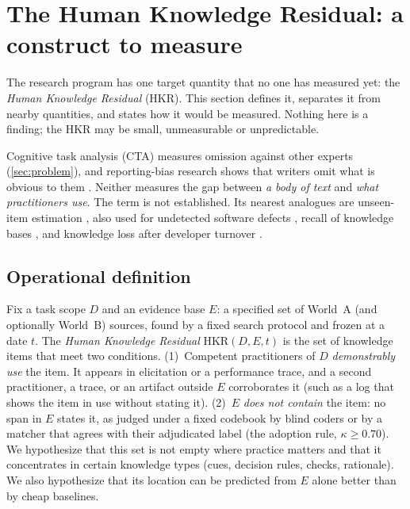 \section{The Human Knowledge Residual: a construct to measure}\label{sec:residual}

The research program has one target quantity that no one has measured yet: the \emph{Human
Knowledge Residual} (HKR). This section defines it, separates it from nearby quantities, and states
how it would be measured. Nothing here is a finding; the HKR may be small, unmeasurable or
unpredictable.

\evlit{} Cognitive task analysis (CTA) measures omission against other experts
(\cref{sec:problem}), and reporting-bias research shows that writers omit what is obvious to them
\parencite{gordon2013reporting}. Neither measures the gap between \emph{a body of text} and
\emph{what practitioners use}. \evint{} The term is not established. Its nearest analogues are
unseen-item estimation \parencite{chao1987estimating,chao2012coverage}, also used for undetected
software defects \parencite{briand2000comprehensive}, recall of knowledge bases
\parencite{razniewski2024completeness}, and knowledge loss after developer turnover
\parencite{rigby2016quantifying}.

\subsection{Operational definition}

\begin{evhypbox}
  Fix a task scope $D$ and an evidence base $E$: a specified set of World~A (and optionally
  World~B) sources, found by a fixed search protocol and frozen at a date $t$. The \emph{Human
  Knowledge Residual} $\mathrm{HKR}(D, E, t)$ is the set of knowledge items that meet two
  conditions. (1)~Competent practitioners of $D$ \emph{demonstrably use} the item. It appears in
  elicitation or a performance trace, and a second practitioner, a trace, or an artifact outside
  $E$ corroborates it (such as a log that shows the item in use without stating it). (2)~$E$
  \emph{does not contain} the item: no span in $E$ states it, as judged under a fixed codebook by
  blind coders or by a matcher that agrees with their adjudicated label (the adoption rule,
  $\kappa \geq 0.70$). We hypothesize
  that this set is not empty where practice matters and that it concentrates in certain knowledge
  types (cues, decision rules, checks, rationale). We also hypothesize that its location can be
  predicted from $E$ alone better than by cheap baselines.
\end{evhypbox}

